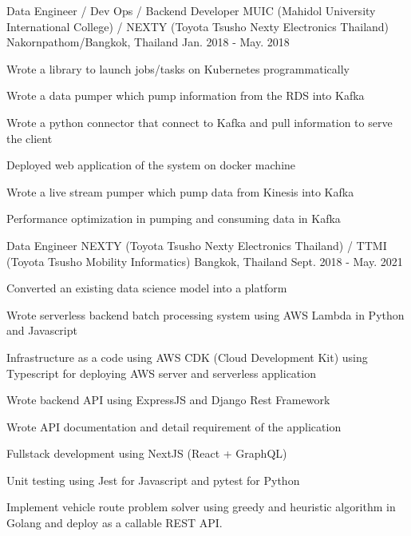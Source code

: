 \begin{cventries}
  \cventry
    {Data Engineer / Dev Ops / Backend Developer} %
    {MUIC (Mahidol University International College) / NEXTY (Toyota Tsusho Nexty Electronics Thailand)} %
    {Nakornpathom/Bangkok, Thailand} %
    {Jan. 2018 - May. 2018} %
    {
      \begin{cvitems} %
        \item {Wrote a library to launch jobs/tasks on Kubernetes programmatically}
        \item {Wrote a data pumper which pump information from the RDS into Kafka}
        \item {Wrote a python connector that connect to Kafka and pull information to serve the client}
        \item {Deployed web application of the system on docker machine}
        \item {Wrote a live stream pumper which pump data from Kinesis into Kafka}
        \item {Performance optimization in pumping and consuming data in Kafka}
      \end{cvitems}
    }

  \cventry
    {Data Engineer} %
    {NEXTY (Toyota Tsusho Nexty Electronics Thailand) / TTMI (Toyota Tsusho Mobility Informatics)} %
    {Bangkok, Thailand} %
    {Sept. 2018 - May. 2021} %
    {
      \begin{cvitems} %
        \item {Converted an existing data science model into a platform}
        \item {Wrote serverless backend batch processing system using AWS Lambda in Python and Javascript}
        \item {
          Infrastructure as a code using AWS CDK (Cloud Development Kit) using
          Typescript for deploying AWS server and serverless application
        }
        \item {Wrote backend API using ExpressJS and Django Rest Framework}
        \item {Wrote API documentation and detail requirement of the application}
        \item {Fullstack development using NextJS (React + GraphQL)}
        \item {Unit testing using Jest for Javascript and pytest for Python}
        \item Implement vehicle route problem solver using greedy and heuristic algorithm in Golang and deploy as a callable REST API. 
      \end{cvitems}
    }
\end{cventries}
